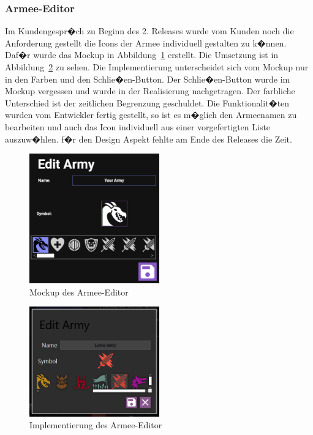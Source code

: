 \documentclass[12pt, titlepage]{scrartcl}
\newcommand{\Abb}[1]{%
	Abbildung\ \ref{#1}%
}
\begin{document}
			\subsubsection{Armee-Editor}
			Im Kundengespr�ch zu Beginn des 2. Releases wurde vom Kunden noch die Anforderung gestellt die Icons der Armee individuell gestalten zu k�nnen. Daf�r wurde das Mockup in \Abb{ArmyEditorMockUp} erstellt. Die Umsetzung ist in \Abb{ArmyEditorImplementation} zu sehen. Die Implementierung unterscheidet sich vom Mockup nur in den Farben und den Schlie�en-Button. Der Schlie�en-Button wurde im Mockup vergessen und wurde in der Realisierung nachgetragen. Der farbliche Unterschied ist der zeitlichen Begrenzung geschuldet. Die Funktionalit�ten wurden vom Entwickler fertig gestellt, so ist es m�glich den Armeenamen zu bearbeiten und auch das Icon individuell aus einer vorgefertigten Liste auszuw�hlen. f�r den Design Aspekt fehlte am Ende des Releases die Zeit.
			
			\begin{figure}[H] 
				\centering
				\includegraphics[width=0.5\textwidth]{ArmyEditor.png}
				\caption{Mockup des Armee-Editor}
				\label{ArmyEditorMockUp}
			\end{figure}
		
			\begin{figure}[H] 
				\centering
				\includegraphics[width=0.5\textwidth]{ArmyEditor_final.PNG}
				\caption{Implementierung des Armee-Editor}
				\label{ArmyEditorImplementation}
			\end{figure}
		
\end{document}
